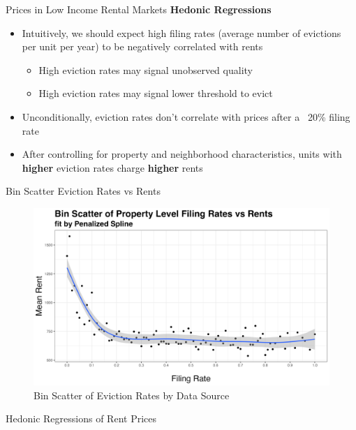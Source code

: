 \documentclass[10pt, xcolor=dvipsnames]{beamer}
\begin{document}

\begin{frame}{Prices in Low Income Rental Markets}
\textbf{Hedonic Regressions}
    \begin{itemize}
    \item Intuitively, we should expect high filing rates (average number of evictions per unit per year) to be negatively correlated with rents
    \begin{itemize}
        \item High eviction rates may signal unobserved quality
        \item High eviction rates may signal lower threshold to evict
    \end{itemize}
    \pause
        \item Unconditionally, eviction rates don't correlate with prices after a ~20\% filing rate
        \pause
        \item After controlling for property and neighborhood characteristics, units with \textbf{higher} eviction rates charge \textbf{higher} rents 
    \end{itemize}
\end{frame}

\begin{frame}{Bin Scatter Eviction Rates vs Rents}
    \begin{figure}
        \centering
        \includegraphics[width=0.75\linewidth]{figs/philadelphia_filing_rate_rent_scatter.png}
        \caption{Bin Scatter of Eviction Rates by Data Source}
        \label{fig:bin-scatter}
    \end{figure}
\end{frame}

\begin{frame}{Hedonic Regressions of Rent Prices}
    \begin{center}
    \Tiny
        
    \end{center}
\end{frame}
\end{document}
